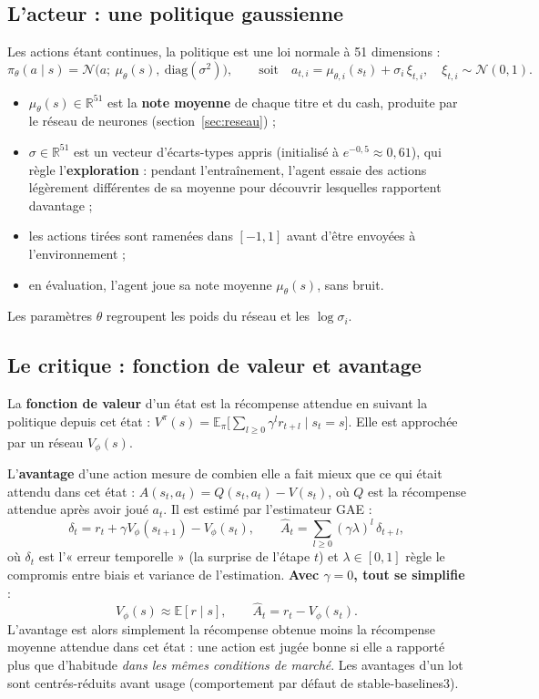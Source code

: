 \documentclass[11pt,a4paper]{article}
\newcommand{\R}{\mathbb{R}}
\newcommand{\E}{\mathbb{E}}
\begin{document}
\subsection{L'acteur : une politique gaussienne}
Les actions étant continues, la politique est une loi normale à 51 dimensions :
\begin{equation}
  \pi_\theta(a\mid s)=\mathcal N\!\big(a;\ \mu_\theta(s),\ \mathrm{diag}(\sigma^2)\big),
  \qquad \text{soit}\quad a_{t,i}=\mu_{\theta,i}(s_t)+\sigma_i\,\xi_{t,i},\quad \xi_{t,i}\sim\mathcal N(0,1).
\end{equation}
\begin{itemize}
  \item \(\mu_\theta(s)\in\R^{51}\) est la \textbf{note moyenne} de chaque titre et du cash, produite par le réseau
        de neurones (section~\ref{sec:reseau}) ;
  \item \(\sigma\in\R^{51}\) est un vecteur d'écarts-types appris (initialisé à \(e^{-0{,}5}\approx0{,}61\)), qui
        règle l'\textbf{exploration} : pendant l'entraînement, l'agent essaie des actions légèrement différentes de sa
        moyenne pour découvrir lesquelles rapportent davantage ;
  \item les actions tirées sont ramenées dans \([-1,1]\) avant d'être envoyées à l'environnement ;
  \item en évaluation, l'agent joue sa note moyenne \(\mu_\theta(s)\), sans bruit.
\end{itemize}
Les paramètres \(\theta\) regroupent les poids du réseau et les \(\log\sigma_i\).

\subsection{Le critique : fonction de valeur et avantage}
La \textbf{fonction de valeur} d'un état est la récompense attendue en suivant la politique depuis cet état :
\(V^{\pi}(s)=\E_\pi\big[\sum_{l\ge0}\gamma^l r_{t+l}\mid s_t=s\big]\). Elle est approchée par un réseau \(V_\phi(s)\).

L'\textbf{avantage} d'une action mesure de combien elle a fait mieux que ce qui était attendu dans cet état :
\(A(s_t,a_t)=Q(s_t,a_t)-V(s_t)\), où \(Q\) est la récompense attendue après avoir joué \(a_t\). Il est estimé par
l'estimateur GAE \cite{schulman2016gae} :
\begin{equation}
  \delta_t=r_t+\gamma V_\phi(s_{t+1})-V_\phi(s_t),\qquad
  \hat A_t=\sum_{l\ge0}(\gamma\lambda)^l\,\delta_{t+l},
\end{equation}
où \(\delta_t\) est l'« erreur temporelle » (la surprise de l'étape \(t\)) et \(\lambda\in[0,1]\) règle le compromis
entre biais et variance de l'estimation. \textbf{Avec \(\gamma=0\), tout se simplifie} :
\[
  V_\phi(s)\approx\E[r\mid s],\qquad \hat A_t=r_t-V_\phi(s_t).
\]
L'avantage est alors simplement la récompense obtenue moins la récompense moyenne attendue dans cet état : une
action est jugée bonne si elle a rapporté plus que d'habitude \emph{dans les mêmes conditions de marché}. Les
avantages d'un lot sont centrés-réduits avant usage (comportement par défaut de stable-baselines3).
\end{document}
